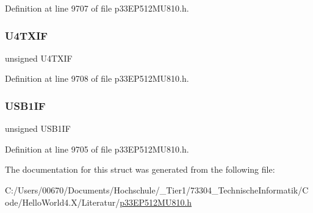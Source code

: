 Definition at line 9707 of file p33\+E\+P512\+M\+U810.\+h.

\mbox{\label{structtag_i_f_s5_b_i_t_s_a724b8a99ab4a10d3304131ddad3d38ff}} 
\subsubsection{\texorpdfstring{U4\+T\+X\+IF}{U4TXIF}}
{\footnotesize\ttfamily unsigned U4\+T\+X\+IF}



Definition at line 9708 of file p33\+E\+P512\+M\+U810.\+h.

\mbox{\label{structtag_i_f_s5_b_i_t_s_ac6482e8da3582b172281d4ee8d4967b1}} 
\subsubsection{\texorpdfstring{U\+S\+B1\+IF}{USB1IF}}
{\footnotesize\ttfamily unsigned U\+S\+B1\+IF}



Definition at line 9705 of file p33\+E\+P512\+M\+U810.\+h.



The documentation for this struct was generated from the following file\+:\begin{DoxyCompactItemize}
\item 
C\+:/\+Users/00670/\+Documents/\+Hochschule/\+\_\+\+Tier1/73304\+\_\+\+Technische\+Informatik/\+Code/\+Hello\+World4.\+X/\+Literatur/\hyperlink{p33_e_p512_m_u810_8h}{p33\+E\+P512\+M\+U810.\+h}\end{DoxyCompactItemize}
